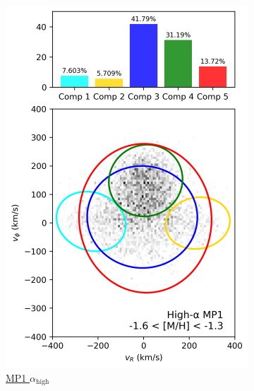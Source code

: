 \documentclass[a4paper,10pt]{article}
\begin{document}
\begin{multicols}{2}
\begin{figure}[H]
\begin{subfigure}[t]{0.24\linewidth}
    \includegraphics[width=\linewidth]{../figures/gmm_mp1_high_alpha_k5.png}
    \caption{\href{https://raw.githack.com/raunaq-rai/Disentangling-the-Milky-Way-using-GMM/main/figures/MP1\_high\_\_\_-1.6\%5BM\_H\%5D-1.3.html}{MP1 $\alpha_{\mathrm{high}}$}}
    \label{fig:mp1_hi}
  \end{subfigure}\hfill
  \begin{subfigure}[t]{0.24\linewidth}

\end{subfigure}
\end{figure}
\end{multicols}
\end{document}
